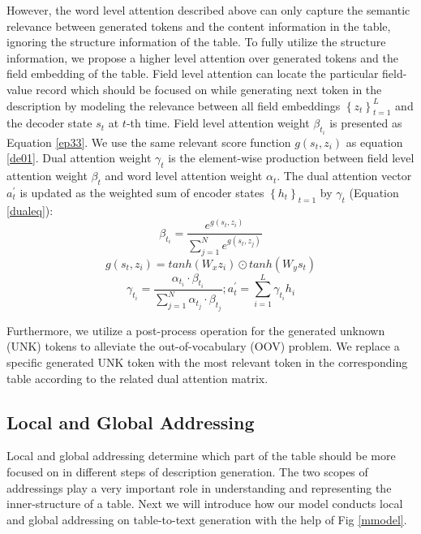 \documentclass[letterpaper]{article} %
\begin{document}
However, the word level attention described above can only capture the semantic relevance between generated tokens and the content information in the table, ignoring the structure information of the table. To fully utilize the structure information, we propose a higher level attention over generated tokens and the field embedding of the table. 
Field level attention can locate the particular field-value record which
should be focused on while generating next token in the description  by modeling the relevance between all field embeddings $\left\{z_t\right\}_{t=1}^{L}$ and the decoder state $s_t$ at $t$-th time. 
Field level attention weight $\beta_{t_i}$ is presented as Equation \ref{ep33}.
We use the same relevant score function $g(s_{t},z_{i})$ as equation \ref{de01}. 
Dual attention weight $\gamma_t$ is the element-wise production between field level attention weight $\beta_t$ and word level attention weight $\alpha_t$. The dual attention vector $a_t^{'}$ is updated as the weighted sum of encoder states $\left\{h_t\right\}_{t=1}$ by $\gamma_t$ (Equation \ref{dualeq}):
\begin{equation}
\beta_{t_i}=\frac{e^{g(s_{t},z_{i})}}{\sum_{j=1}^{N}{e^{g(s_{t},z_{j})}}}
\label{ep33}
\end{equation}
\begin{equation}
	g(s_{t},z_{i}) = tanh(W_xz_i) \odot tanh(W_ys_t)
\end{equation}
\begin{equation}
	\gamma_{t_i} =  \frac{\alpha_{t_i} \cdot \beta_{t_i}}
	{\sum_{j=1}^{N}{\alpha_{t_j} \cdot \beta_{t_j}}} ;
	a_t^{'} = \sum_{i=1}^L \gamma_{t_i} h_i
\label{dualeq}
\end{equation}

Furthermore, we utilize a post-process operation for the generated unknown (UNK) tokens to alleviate the out-of-vocabulary (OOV) problem. We replace a specific generated UNK token with the most relevant token in the corresponding table according to the related dual attention matrix. 

\subsection{Local and Global Addressing}
Local and global addressing determine which part of the table should be more focused on in different steps of description generation. The two scopes of addressings play a very important role in understanding and representing the inner-structure of a table. 
Next we will introduce how our model conducts local and global addressing on table-to-text generation with the help of Fig \ref{mmodel}.
\end{document}
